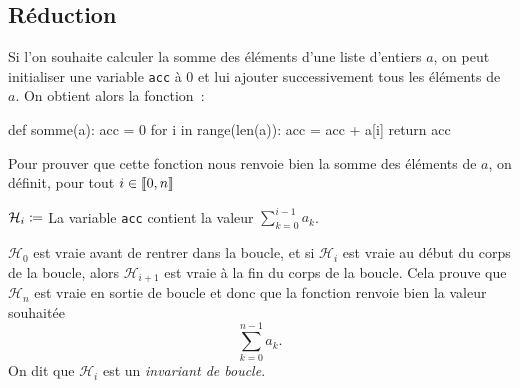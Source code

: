 \documentclass{magnolia}
\begin{document}




    

\subsection{Réduction}

Si l'on souhaite calculer la somme des éléments d'une liste d'entiers $a$, on peut initialiser
une variable \verb_acc_ à 0 et lui ajouter successivement tous les éléments de $a$. On obtient
alors la fonction~:

\begin{pythoncodeline}
def somme(a):
    acc = 0
    for i in range(len(a)):
        acc = acc + a[i]
    return acc
\end{pythoncodeline}
\noindent
Pour prouver que cette fonction nous renvoie bien
la somme des éléments de $a$, on définit, pour tout $i\in\left\llbracket 0,n\right\rrbracket$

\begin{center}
$\mathcal{H}_i \coloneqq$ \og La variable \verb_acc_ contient la valeur
$\displaystyle\sum_{k=0}^{i-1} a_k$. \fg
\end{center}
\noindent
$\mathcal{H}_0$ est vraie avant de rentrer dans la boucle, et si $\mathcal{H}_i$ est vraie au début du
corps de la boucle, alors $\mathcal{H}_{i+1}$ est vraie à la fin du corps de la boucle. Cela prouve que $\mathcal{H}_n$ est vraie
en sortie de boucle et donc que la fonction renvoie bien la valeur souhaitée
\[\sum_{k=0}^{n-1} a_k.\]
On dit que $\mathcal{H}_i$ est un \emph{invariant de boucle}.\\
\end{document}
